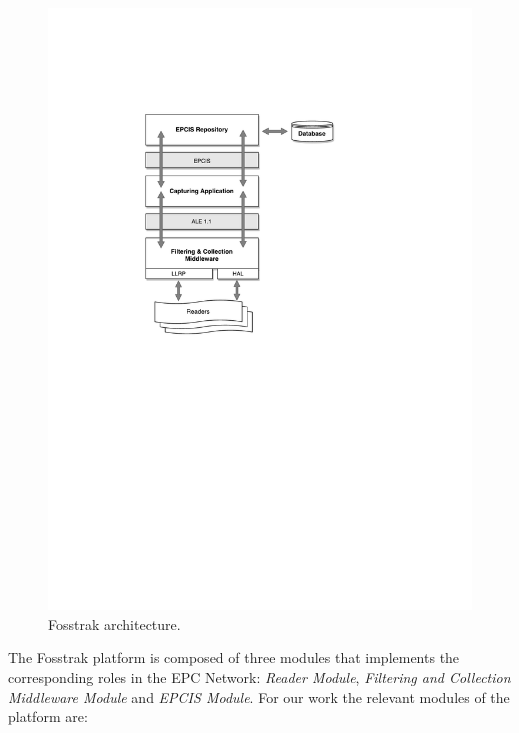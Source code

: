 \begin{figure}[ht!]
  \centering
  \includegraphics[width=.65\textwidth]{./images/fosstrak_architecture}
  \caption[Fosstrak architecture.]{Fosstrak architecture.}
  \label{fig:fosstrak_architecture}
\end{figure}

The Fosstrak platform is composed of three modules that implements the corresponding roles in the
\gls{EPC} Network: \textit{Reader Module}, \textit{Filtering and Collection Middleware Module} and
\textit{EPCIS Module}. For our work the relevant modules of the platform are:

